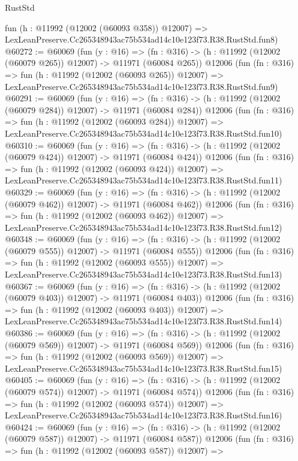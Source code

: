 \begin{lexlean}{RustStd}
\begin{coremodule}
    fun (h : @11992 (@12002 (@60093 @358)) @12007) =>
    LexLeanPreserve.Cc265348943ac75b534ad14c10e123f73.R38.RustStd.fun8)
@60272 := @60069
    (fun (y : @16) =>
    (fn : @316) -> (h : @11992 (@12002 (@60079 @265)) @12007) -> @11971 (@60084 @265))
    @12006
    (fun (fn : @316) =>
    fun (h : @11992 (@12002 (@60093 @265)) @12007) =>
    LexLeanPreserve.Cc265348943ac75b534ad14c10e123f73.R38.RustStd.fun9)
@60291 := @60069
    (fun (y : @16) =>
    (fn : @316) -> (h : @11992 (@12002 (@60079 @284)) @12007) -> @11971 (@60084 @284))
    @12006
    (fun (fn : @316) =>
    fun (h : @11992 (@12002 (@60093 @284)) @12007) =>
    LexLeanPreserve.Cc265348943ac75b534ad14c10e123f73.R38.RustStd.fun10)
@60310 := @60069
    (fun (y : @16) =>
    (fn : @316) -> (h : @11992 (@12002 (@60079 @424)) @12007) -> @11971 (@60084 @424))
    @12006
    (fun (fn : @316) =>
    fun (h : @11992 (@12002 (@60093 @424)) @12007) =>
    LexLeanPreserve.Cc265348943ac75b534ad14c10e123f73.R38.RustStd.fun11)
@60329 := @60069
    (fun (y : @16) =>
    (fn : @316) -> (h : @11992 (@12002 (@60079 @462)) @12007) -> @11971 (@60084 @462))
    @12006
    (fun (fn : @316) =>
    fun (h : @11992 (@12002 (@60093 @462)) @12007) =>
    LexLeanPreserve.Cc265348943ac75b534ad14c10e123f73.R38.RustStd.fun12)
@60348 := @60069
    (fun (y : @16) =>
    (fn : @316) -> (h : @11992 (@12002 (@60079 @555)) @12007) -> @11971 (@60084 @555))
    @12006
    (fun (fn : @316) =>
    fun (h : @11992 (@12002 (@60093 @555)) @12007) =>
    LexLeanPreserve.Cc265348943ac75b534ad14c10e123f73.R38.RustStd.fun13)
@60367 := @60069
    (fun (y : @16) =>
    (fn : @316) -> (h : @11992 (@12002 (@60079 @403)) @12007) -> @11971 (@60084 @403))
    @12006
    (fun (fn : @316) =>
    fun (h : @11992 (@12002 (@60093 @403)) @12007) =>
    LexLeanPreserve.Cc265348943ac75b534ad14c10e123f73.R38.RustStd.fun14)
@60386 := @60069
    (fun (y : @16) =>
    (fn : @316) -> (h : @11992 (@12002 (@60079 @569)) @12007) -> @11971 (@60084 @569))
    @12006
    (fun (fn : @316) =>
    fun (h : @11992 (@12002 (@60093 @569)) @12007) =>
    LexLeanPreserve.Cc265348943ac75b534ad14c10e123f73.R38.RustStd.fun15)
@60405 := @60069
    (fun (y : @16) =>
    (fn : @316) -> (h : @11992 (@12002 (@60079 @574)) @12007) -> @11971 (@60084 @574))
    @12006
    (fun (fn : @316) =>
    fun (h : @11992 (@12002 (@60093 @574)) @12007) =>
    LexLeanPreserve.Cc265348943ac75b534ad14c10e123f73.R38.RustStd.fun16)
@60424 := @60069
    (fun (y : @16) =>
    (fn : @316) -> (h : @11992 (@12002 (@60079 @587)) @12007) -> @11971 (@60084 @587))
    @12006
    (fun (fn : @316) =>
    fun (h : @11992 (@12002 (@60093 @587)) @12007) =>

\end{coremodule}
\end{lexlean}
